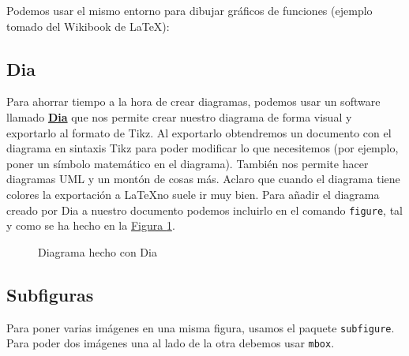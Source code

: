\documentclass[a4paper]{article}
\begin{document}
Podemos usar el mismo entorno para dibujar gráficos de funciones (ejemplo tomado del Wikibook de \LaTeX):
\begin{figure}[H]
  \centering
\end{figure}

\subsection{Dia}

Para ahorrar tiempo a la hora de crear diagramas, podemos usar un software llamado \href{http://dia-installer.de/}{\textbf{Dia}} que nos permite crear nuestro diagrama de forma visual y exportarlo al formato de Tikz. Al exportarlo obtendremos un documento con el diagrama en sintaxis Tikz para poder modificar lo que necesitemos (por ejemplo, poner un símbolo matemático en el diagrama). También nos permite hacer diagramas UML y un montón de cosas más. Aclaro que cuando el diagrama tiene colores la exportación a \LaTeX no suele ir muy bien. Para añadir el diagrama creado por Dia a nuestro documento podemos incluirlo en el comando \texttt{figure}, tal y como se ha hecho en la \hyperref[dia]{Figura \ref*{dia}}.

\begin{figure}[!h]
  \centering
  
  \caption{Diagrama hecho con Dia}
  \label{dia}
\end{figure}

\subsection{Subfiguras}

Para poner varias imágenes en una misma figura, usamos el paquete \texttt{subfigure}. Para poder dos imágenes una al lado de la otra debemos usar \texttt{mbox}.
\end{document}
